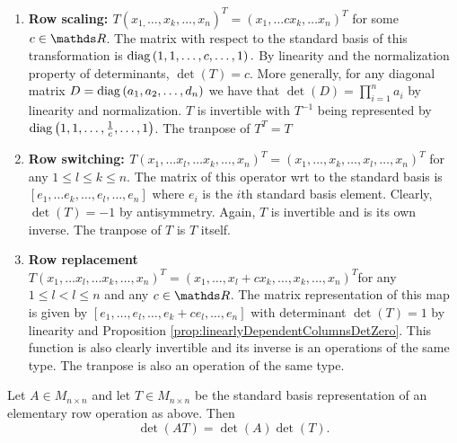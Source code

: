 \begin{enumerate}
\item \textbf{Row scaling: $T\left(x_{1,}\ldots,x_{k},\ldots,x_{n}\right)^{T}=\left(x_{1},\ldots cx_{k},\ldots x_{n}\right)^{T}$
}for some $c\in\R$. The matrix with respect to the standard basis
of this transformation is $\mathrm{diag}\left(1,1,\ldots,c,\ldots,1\right).$
By linearity and the normalization property of determinants, $\det\left(T\right)=c.$
More generally, for any diagonal matrix $D=\mathrm{diag}\left(a_{1},a_{2},\ldots,d_{n}\right)$
we have that $\det\left(D\right)=\prod_{i=1}^{n}a_{i}$ by linearity
and normalization. $T$ is invertible with $T^{-1}$ being represented
by $\mathrm{diag}\left(1,1,\ldots,\frac{1}{c},\ldots,1\right)$. The tranpose
of $T^{T}=T$
\item \textbf{Row switching: $T\left(x_{1},\ldots x_{l},\ldots x_{k},\ldots,x_{n}\right)^{T}=\left(x_{1},\ldots,x_{k},\ldots,x_{l},\ldots,x_{n}\right)^{T}$
}for any $1\leq l\leq k\leq n.$ The matrix of this operator wrt to
the standard basis is $\left[e_{1},\ldots e_{k},\ldots,e_{l},\ldots,e_{n}\right]$
where $e_{i}$ is the $i$th standard basis element. Clearly, $\det\left(T\right)=-1$
by antisymmetry. Again, $T$ is invertible and is its own inverse.
The tranpose of $T$ is $T$ itself.
\item \textbf{Row replacement$T\left(x_{1},\ldots x_{l},\ldots x_{k},\ldots,x_{n}\right)^{T}=\left(x_{1},\ldots,x_{l}+cx_{k},\ldots,x_{k},\ldots,x_{n}\right)^{T}$}for
any $1\leq l<l\leq n$ and any $c\in\R$. The matrix representation
of this map is given by $\left[e_{1},\ldots,e_{l},\ldots,e_{k}+ce_{l},\ldots,e_{n}\right]$
with determinant $\det\left(T\right)=1$ by linearity and Proposition
\ref{prop:linearlyDependentColumnsDetZero}. This function is also
clearly invertible and its inverse is an operations of the same type.
The tranpose is also an operation of the same type.
\end{enumerate}
\begin{prop}
\label{prop:detMatrixTimesElementary}Let $A\in M_{n\times n}$ and
let $T\in M_{n\times n}$ be the standard basis representation of
an elementary row operation as above. Then
\[
\det\left(AT\right)=\det\left(A\right)\det\left(T\right).
\]
\end{prop}

